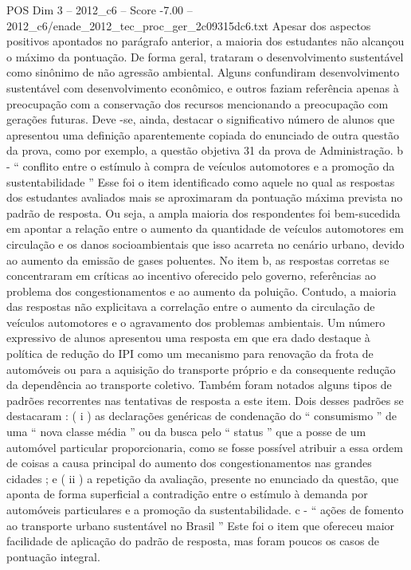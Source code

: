 \begin{textsample}{POS Dim 3 – 2012\_c6 – Score -7.00 – 2012\_c6/enade\_2012\_tec\_proc\_ger\_2c09315dc6.txt}
Apesar dos aspectos positivos apontados no parágrafo anterior, a maioria dos estudantes não alcançou o máximo da pontuação.
De forma geral, trataram o desenvolvimento sustentável como sinônimo de não agressão ambiental.
Alguns confundiram desenvolvimento sustentável com desenvolvimento econômico, e outros faziam referência apenas à preocupação com a conservação dos recursos mencionando a preocupação com gerações futuras.
Deve -se, ainda, destacar o significativo número de alunos que apresentou uma definição aparentemente copiada do enunciado de outra questão da prova, como por exemplo, a questão objetiva 31 da prova de Administração. b - “ conflito entre o estímulo à compra de veículos automotores e a promoção da sustentabilidade ” Esse foi o item identificado como aquele no qual as respostas dos estudantes avaliados mais se aproximaram da pontuação máxima prevista no padrão de resposta.
Ou seja, a ampla maioria dos respondentes foi bem-sucedida em apontar a relação entre o aumento da quantidade de veículos automotores em circulação e os danos socioambientais que isso acarreta no cenário urbano, devido ao aumento da emissão de gases poluentes.
No item b, as respostas corretas se concentraram em críticas ao incentivo oferecido pelo governo, referências ao problema dos congestionamentos e ao aumento da poluição.
Contudo, a maioria das respostas não explicitava a correlação entre o aumento da circulação de veículos automotores e o agravamento dos problemas ambientais.
Um número expressivo de alunos apresentou uma resposta em que era dado destaque à política de redução do IPI como um mecanismo para renovação da frota de automóveis ou para a aquisição do transporte próprio e da consequente redução da dependência ao transporte coletivo.
Também foram notados alguns tipos de padrões recorrentes nas tentativas de resposta a este item.
Dois desses padrões se destacaram : ( i ) as declarações genéricas de condenação do “ consumismo ” de uma “ nova classe média ” ou da busca pelo “ status ” que a posse de um automóvel particular proporcionaria, como se fosse possível atribuir a essa ordem de coisas a causa principal do aumento dos congestionamentos nas grandes cidades ; e ( ii ) a repetição da avaliação, presente no enunciado da questão, que aponta de forma superficial a contradição entre o estímulo à demanda por automóveis particulares e a promoção da sustentabilidade. c - “ ações de fomento ao transporte urbano sustentável no Brasil ” Este foi o item que ofereceu maior facilidade de aplicação do padrão de resposta, mas foram poucos os casos de pontuação integral.

\end{textsample}
